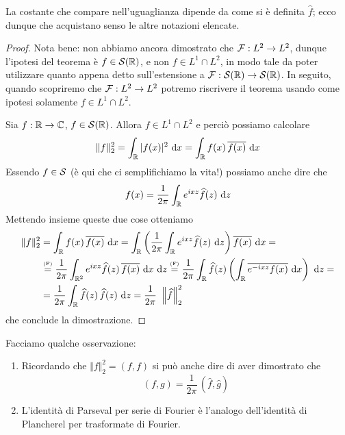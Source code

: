 \begin{rem}
La costante che compare nell'uguaglianza dipende da come si è definita $\hat{f}$; ecco dunque che acquistano senso le altre notazioni elencate.
\end{rem}

\begin{proof} 
Nota bene: non abbiamo ancora dimostrato che $\mathcal{F}: L^2\to L^2$, dunque l'ipotesi del teorema è $f\in\mathcal{S}(\mathbb{R})$, e non $f\in L^1\cap L^2$, in modo tale da poter utilizzare quanto appena detto sull'estensione a $\mathcal{F} : \mathcal{S}(\mathbb{R})\rightarrow \mathcal{S}(\mathbb{R})$. In seguito, quando scopriremo che $\mathcal{F}: L^2\to L^2$ potremo riscrivere il teorema usando come ipotesi solamente $f\in L^1\cap L^2$.

Sia $f:\mathbb{R}\to\mathbb{C}$, $f\in\mathcal{S}(\mathbb{R})$. Allora $f\in L^1\cap L^2$ e perciò possiamo calcolare
\begin{equation*}
\Vert f \Vert_2^2=\int_{\mathbb{R}} |f(x)|^{2} \  \mathrm{d} x = \int_{\mathbb{R}} f(x)\,\overline{f(x)}\  \mathrm{d} x
\end{equation*}
Essendo $f\in\mathcal{S}$ (è qui che ci semplifichiamo la vita!) possiamo anche dire che
\begin{equation*}
f(x)=\frac{1}{2\pi}\int_{\mathbb{R}} e^{ixz}\widehat{f}(z) \  \mathrm{d} z
\end{equation*}
Mettendo insieme queste due cose otteniamo
\begin{align*}
\Vert f \Vert_2^2&=\int_\RR f(x)\,\overline{f(x)}\dx=\int_\RR \left(\frac{1}{2\pi}\int_\RR e^{ixz}\hat{f}(z) \dz\right)\overline{f(x)}\dx =\\
&\overset{\underset{\mathrm{(F)}}{}}{=}\frac{1}{2\pi}\int_{\RR^2}e^{ixz}\hat{f}(z)\,\overline{f(x)}\dx\dz\overset{\underset{\mathrm{(F)}}{}}{=}\frac{1}{2\pi}\int_\RR \hat{f}(z) \left(\int_\RR \overline{e^{-ixz}f(x)} \dx\right)\dz=\\
&=\frac{1}{2\pi}\int_\RR \hat{f}(z)\,\hat{f}(z)\dz=\frac{1}{2\pi}\ \left\|\hat{f}\right\|_2^2
\end{align*}
che conclude la dimostrazione.
\end{proof}

Facciamo qualche osservazione:
\begin{enumerate}
    \item Ricordando che $\Vert f\Vert_2^2=(f,f)$ si può anche dire di aver dimostrato che
    \begin{equation*}
    (f,g)=\frac{1}{2\pi}\,\left(\hat{f},\hat{g}\right)
    \end{equation*}

    \item L'identità di Parseval per serie di Fourier è l'analogo dell'identità di Plancherel per trasformate di Fourier.
\end{enumerate}

